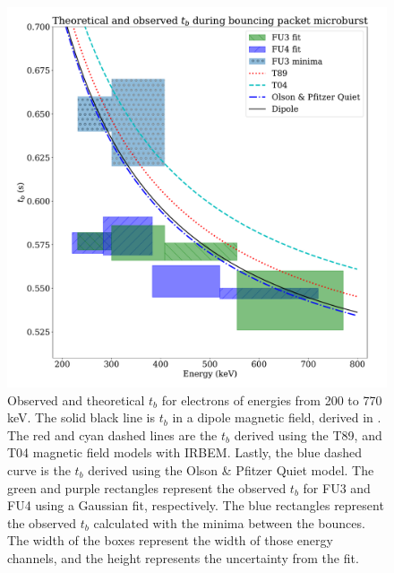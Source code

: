 \documentclass[draft, linenumbers]{agujournal}
\begin{document}
\begin{figure}
\includegraphics[width=\textwidth]{detrended_bounce_period_boxed_adj.pdf}
\caption{Observed and theoretical $t_b$ for electrons of energies from 200 to 770 keV. The solid black line is $t_b$ in a dipole magnetic field, derived in \citet{Schulz1974}. The red and cyan dashed lines are the $t_b$ derived using the T89, and T04 magnetic field models with IRBEM. Lastly, the blue dashed curve is the $t_b$ derived using the Olson \& Pfitzer Quiet model. The green and purple rectangles represent the observed $t_b$ for FU3 and FU4 using a Gaussian fit, respectively. The blue rectangles represent the observed $t_b$ calculated with the minima between the bounces. The width of the boxes represent the width of those energy channels, and the height represents the uncertainty from the fit.}
\label{tb_plot}
\end{figure}




\end{document}

